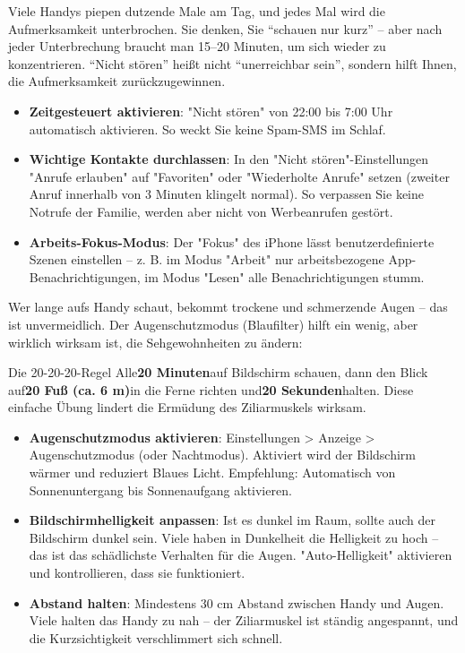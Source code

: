
Viele Handys piepen dutzende Male am Tag, und jedes Mal wird die Aufmerksamkeit unterbrochen. Sie denken, Sie “schauen nur kurz” – aber nach jeder Unterbrechung braucht man 15–20 Minuten, um sich wieder zu konzentrieren. “Nicht stören” heißt nicht “unerreichbar sein”, sondern hilft Ihnen, die Aufmerksamkeit zurückzugewinnen.

\begin{itemize}
  \item \textbf{Zeitgesteuert aktivieren}: "Nicht stören" von 22:00 bis 7:00 Uhr automatisch aktivieren. So weckt Sie keine Spam-SMS im Schlaf.
  \item \textbf{Wichtige Kontakte durchlassen}: In den "Nicht stören"-Einstellungen "Anrufe erlauben" auf "Favoriten" oder "Wiederholte Anrufe" setzen (zweiter Anruf innerhalb von 3 Minuten klingelt normal). So verpassen Sie keine Notrufe der Familie, werden aber nicht von Werbeanrufen gestört.
  \item \textbf{Arbeits-Fokus-Modus}: Der "Fokus" des iPhone lässt benutzerdefinierte Szenen einstellen – z. B. im Modus "Arbeit" nur arbeitsbezogene App-Benachrichtigungen, im Modus "Lesen" alle Benachrichtigungen stumm.
\end{itemize}


Wer lange aufs Handy schaut, bekommt trockene und schmerzende Augen – das ist unvermeidlich. Der Augenschutzmodus (Blaufilter) hilft ein wenig, aber wirklich wirksam ist, die Sehgewohnheiten zu ändern:

\begin{tcbinfo}{Die 20-20-20-Regel}
Alle\textbf{20 Minuten}auf Bildschirm schauen, dann den Blick auf\textbf{20 Fuß (ca. 6 m)}in die Ferne richten und\textbf{20 Sekunden}halten. Diese einfache Übung lindert die Ermüdung des Ziliarmuskels wirksam.

\end{tcbinfo}

\begin{itemize}
  \item \textbf{Augenschutzmodus aktivieren}: Einstellungen > Anzeige > Augenschutzmodus (oder Nachtmodus). Aktiviert wird der Bildschirm wärmer und reduziert Blaues Licht. Empfehlung: Automatisch von Sonnenuntergang bis Sonnenaufgang aktivieren.
  \item \textbf{Bildschirmhelligkeit anpassen}: Ist es dunkel im Raum, sollte auch der Bildschirm dunkel sein. Viele haben in Dunkelheit die Helligkeit zu hoch – das ist das schädlichste Verhalten für die Augen. "Auto-Helligkeit" aktivieren und kontrollieren, dass sie funktioniert.
  \item \textbf{Abstand halten}: Mindestens 30 cm Abstand zwischen Handy und Augen. Viele halten das Handy zu nah – der Ziliarmuskel ist ständig angespannt, und die Kurzsichtigkeit verschlimmert sich schnell.
\end{itemize}

